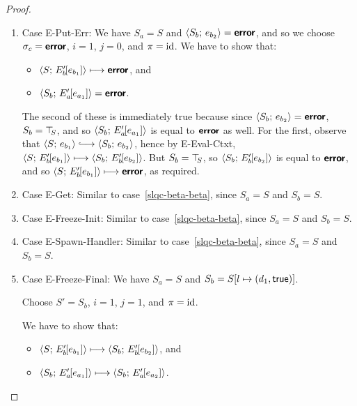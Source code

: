 \begin{proof}
\begin{enumerate}
\begin{enumerate}
    \item \label{slqc-beta-put-err}Case {\sc E-Put-Err}: We have $S_a
      = S$ and $\langle S_b;\, e_{b_2} \rangle = \textbf{\textsf{error}}$, and so we choose
      $\sigma_c = \textbf{\textsf{error}}$, $i = 1$, $j = 0$, and $\pi = \mathrm{id}$.  We have
      to show that:
      \begin{itemize}
      \item $\langle S;\, E'_b\hspace{-1mm}\left[e_{b_1}\right] \rangle \longmapsto \textbf{\textsf{error}}$,
        and
      \item $\langle S_b;\, E'_a\hspace{-1mm}\left[e_{a_1}\right] \rangle = \textbf{\textsf{error}}$.
      \end{itemize}

      The second of these is immediately true because since
      $\langle S_b;\, e_{b_2} \rangle = \textbf{\textsf{error}}$, $S_b = \top\hspace{-0.85mm}_{S}$, and so
      $\langle S_b;\, E'_a\hspace{-1mm}\left[e_{a_1}\right] \rangle$ is equal to $\textbf{\textsf{error}}$ as
      well.  For the first, observe that $\config{S}{e_{b_1}}
      \parstepsto \config{S_b}{e_{b_2}}$, hence by {\sc E-Eval-Ctxt},
      $\langle S;\, E'_b\hspace{-1mm}\left[e_{b_1}\right] \rangle \longmapsto
      \langle S_b;\, E'_b\hspace{-1mm}\left[e_{b_2}\right] \rangle$.  But $S_b = \top\hspace{-0.85mm}_{S}$, so
      $\langle S_b;\, E'_b\hspace{-1mm}\left[e_{b_2}\right] \rangle$ is equal to $\textbf{\textsf{error}}$,
      and so $\langle S;\, E'_b\hspace{-1mm}\left[e_{b_1}\right] \rangle \longmapsto
      \textbf{\textsf{error}}$, as required.

    \item \label{slqc-beta-get}Case {\sc E-Get}: Similar to
      case~\ref{slqc-beta-beta}, since $S_a = S$ and $S_b = S$.
    \item \label{slqc-beta-freeze-init}Case {\sc E-Freeze-Init}:
      Similar to case~\ref{slqc-beta-beta}, since $S_a = S$ and $S_b =
      S$.
    \item \label{slqc-beta-spawn-handler}Case {\sc E-Spawn-Handler}:
      Similar to case~\ref{slqc-beta-beta}, since $S_a = S$ and $S_b =
      S$.
    \item \label{slqc-beta-freeze-final}Case {\sc E-Freeze-Final}: We
      have $S_a = S$ and $S_b = S[l \mapsto (d_1, \textsf{true})]$.

      Choose $S' = S_b$, $i = 1$, $j = 1$, and $\pi = \mathrm{id}$.

      We have to show that:
      \begin{itemize}
      \item $\langle S;\, E'_b\hspace{-1mm}\left[e_{b_1}\right] \rangle \longmapsto
        \langle S_b;\, E'_b\hspace{-1mm}\left[e_{b_2}\right] \rangle$, and
      \item $\langle S_b;\, E'_a\hspace{-1mm}\left[e_{a_1}\right] \rangle \longmapsto
        \langle S_b;\, E'_a\hspace{-1mm}\left[e_{a_2}\right] \rangle$.
      \end{itemize}


\end{enumerate}
\end{enumerate}
\end{proof}
